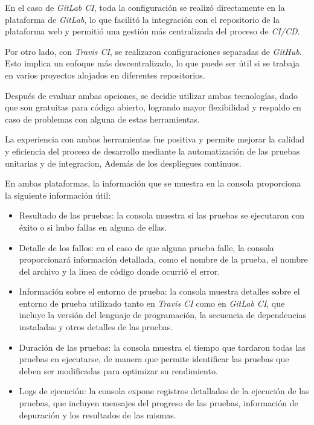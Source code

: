En el caso de \textit{GitLab CI}, toda la configuración se realizó directamente en la plataforma de \textit{GitLab}, lo que facilitó la integración con el repositorio de la plataforma web y permitió una gestión más centralizada del proceso de \textit{CI/CD}.

Por otro lado, con \textit{Travis CI}, se realizaron configuraciones separadas de \textit{GitHub}. Esto implica un enfoque más descentralizado, lo que puede ser útil si se trabaja en varios proyectos alojados en diferentes repositorios.

Después de evaluar ambas opciones, se decidie utilizar ambas tecnologías, dado que son gratuitas para código abierto, logrando mayor flexibilidad y respaldo en caso de problemas con alguna de estas herramientas.

La experiencia con ambas herramientas fue positiva y permite mejorar la calidad y eficiencia del proceso de desarrollo mediante la automatización de las pruebas unitarias y de integracion, Además de los despliegues continuos.

En ambas plataformas, la información que se muestra en la consola proporciona la siguiente información útil:

\begin{itemize}
	\item Resultado de las pruebas: la consola muestra si las pruebas se ejecutaron con éxito o si hubo fallas en alguna de ellas. 
	
	\item Detalle de los fallos: en el caso de que alguna prueba falle, la consola proporcionará información detallada, como el nombre de la prueba, el nombre del archivo y la línea de código donde ocurrió el error.
	
	\item Información sobre el entorno de prueba: la consola muestra detalles sobre el entorno de prueba utilizado tanto en \textit{Travis CI} como en \textit{GitLab CI}, que incluye la versión del lenguaje de programación, la secuencia de dependencias instaladas y otros detalles de las pruebas.
	
	\item Duración de las pruebas: la consola muestra el tiempo que tardaron todas las pruebas en ejecutarse, de manera que permite identificar las pruebas que deben ser modificadas para optimizar su rendimiento.
	
	\item Logs de ejecución: la consola expone registros detallados de la ejecución de las pruebas, que incluyen mensajes del progreso de las pruebas, información de depuración y los resultados de las mismas.
	
\end{itemize}

